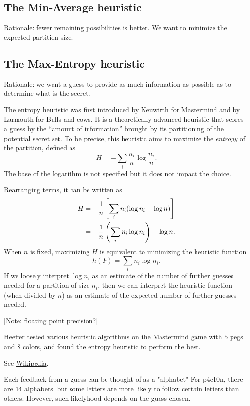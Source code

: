 \subsection{The Min-Average heuristic}

Rationale: fewer remaining possibilities is better. We want to minimize the expected partition size.

\subsection{The Max-Entropy heuristic}

Rationale: we want a guess to provide as much information as possible as to determine what is the secret.

The entropy heuristic was first introduced by Neuwirth \cite{neuwirth81} for Mastermind and by Larmouth \cite{aleph71} for Bulls and cows. It is a theoretically advanced heuristic that scores a guess by the ``amount of information'' brought by its partitioning of the potential secret set. To be precise, this heuristic aims to maximize the \emph{entropy} of the partition, defined as
\[
H = -\sum_i \frac{n_i}{n} \log \frac{n_i}{n} .
\]
The base of the logarithm is not specified but it does not impact the choice. 

Rearranging terms, it can be written as
\begin{align}
H 
&= - \frac{1}{n} \left[ \sum_i n_i (\log n_i - \log n ) \right] \notag \\
&= - \frac{1}{n} \left( \sum_i n_i \log n_i \right) + \log n . \notag
\end{align}
When $n$ is fixed, maximizing $H$ is equivalent to minimizing the heuristic function
\[
h(P) = \sum_i n_i \log n_i .
\]
If we loosely interpret $\log n_i$ as an estimate of the number of further guesses needed for a partition of size $n_i$, then we can interpret the heuristic function (when divided by $n$) as an estimate of the expected number of further guesses needed. 

[Note: floating point precision?]

Heeffer \cite{heeffer07} tested various heuristic algorithms on the Mastermind game with 5 pegs and 8 colors, and found the entropy heuristic to perform the best.

See \href{http://en.wikipedia.org/wiki/Entropy\_(information\_theory)\#Further\_properties}{Wikipedia}.

Each feedback from a guess can be thought of as a "alphabet"
For p4c10n, there are 14 alphabets, but some letters are more likely to follow certain letters than others. However, such likelyhood depends on the guess chosen.

